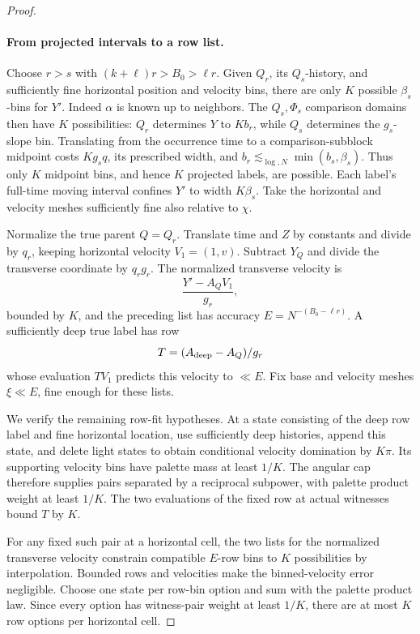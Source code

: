 \begin{proof}
\leavevmode\par
\paragraph{From projected intervals to a row list.}
Choose \(r>s\) with \((k+\ell)r>B_0>\ell r\).
Given \(Q_r\), its \(Q_s\)-history, and sufficiently fine
horizontal position and velocity bins, there are only \(K\)
possible \(\beta_s\)-bins for \(Y'\).  Indeed \(\alpha\)
is known up to neighbors.  The \(Q_s,\Phi_s\) comparison domains
then have \(K\) possibilities: \(Q_r\) determines \(Y\) to
\(Kb_r\), while \(Q_s\) determines the \(g_s\)-slope bin.
Translating from the occurrence time to a comparison-subblock
midpoint costs \(Kg_sq\), its prescribed width, and
\(b_r\lesssim_{\log,N}\min(b_s,\beta_s)\).
Thus only \(K\) midpoint bins, and hence \(K\) projected
labels, are possible.  Each label's full-time moving interval
confines \(Y'\) to width \(K\beta_s\).  Take the horizontal
and velocity meshes sufficiently fine also relative to \(\chi\).

Normalize the true parent \(Q=Q_r\).  Translate time and \(Z\)
by constants and divide by \(q_r\), keeping horizontal velocity
\(V_1=(1,v)\).  Subtract \(Y_Q\) and divide the transverse
coordinate by \(q_rg_r\).  The normalized transverse velocity is
\[
 \frac{Y'-A_QV_1}{g_r},
\]
bounded by \(K\), and the preceding list has accuracy
\(E=N^{-(B_0-\ell r)}\).  A sufficiently deep true label has row
\[
 T=(A_{\rm deep}-A_Q)/g_r
\]
whose evaluation \(TV_1\) predicts this velocity to \(\ll E\).
Fix base and velocity meshes \(\xi\ll E\), fine enough for
these lists.

We verify the remaining row-fit hypotheses.  At a state consisting
of the deep row label and fine horizontal location, use sufficiently
deep histories, append this state, and delete light states to obtain conditional
velocity domination by \(K\pi\).  Its supporting velocity bins
have palette mass at least \(1/K\).  The angular cap therefore
supplies pairs separated by a reciprocal subpower, with palette
product weight at least \(1/K\).  The two evaluations of the fixed
row at actual witnesses bound \(T\) by \(K\).

For any fixed such pair at a horizontal cell, the two lists for the
normalized transverse velocity constrain compatible \(E\)-row
bins to \(K\) possibilities by interpolation.  Bounded rows and
velocities make the binned-velocity error negligible.  Choose one
state per row-bin option and sum with the palette product law.
Since every option has witness-pair weight at least \(1/K\), there
are at most \(K\) row options per horizontal cell.


\end{proof}
